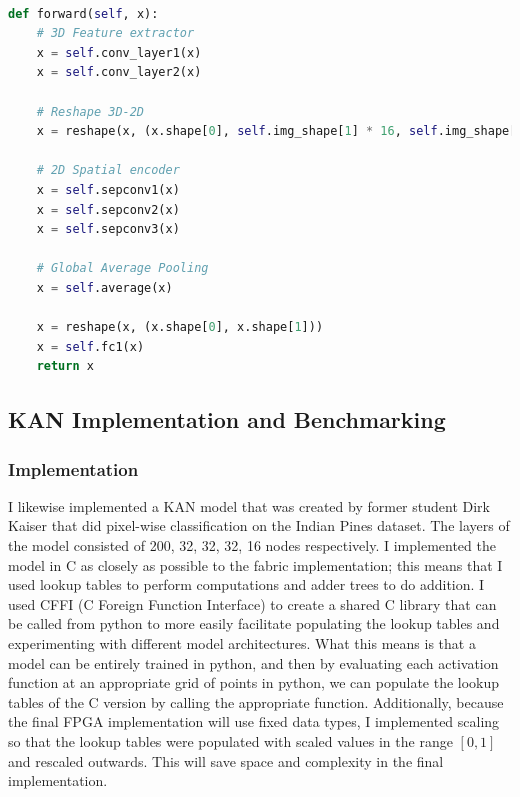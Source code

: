 \documentclass{article}
\begin{document}
\begin{lstlisting}[language=python]

def forward(self, x):
    # 3D Feature extractor
    x = self.conv_layer1(x)
    x = self.conv_layer2(x)

    # Reshape 3D-2D
    x = reshape(x, (x.shape[0], self.img_shape[1] * 16, self.img_shape[2], self.img_shape[3]))

    # 2D Spatial encoder
    x = self.sepconv1(x)
    x = self.sepconv2(x)
    x = self.sepconv3(x)

    # Global Average Pooling
    x = self.average(x)

    x = reshape(x, (x.shape[0], x.shape[1]))
    x = self.fc1(x)
    return x

\end{lstlisting}



\subsection{KAN Implementation and Benchmarking}

\subsubsection{Implementation}
I likewise implemented a KAN model that was created by former student Dirk Kaiser that did pixel-wise classification on the Indian Pines dataset. The layers of the model consisted of 200, 32, 32, 32, 16 nodes respectively. I implemented the model in C as closely as possible to the fabric implementation; this means that I used lookup tables to perform computations and adder trees to do addition. I used CFFI (C Foreign Function Interface) to create a shared C library that can be called from python to more easily facilitate populating the lookup tables and experimenting with different model architectures. What this means is that a model can be entirely trained in python, and then by evaluating each activation function at an appropriate grid of points in python, we can populate the lookup tables of the C version by calling the appropriate function. Additionally, because the final FPGA implementation will use fixed data types, I implemented scaling so that the lookup tables were populated with scaled values in the range $[0,1]$ and rescaled outwards. This will save space and complexity in the final implementation. 
\end{document}
